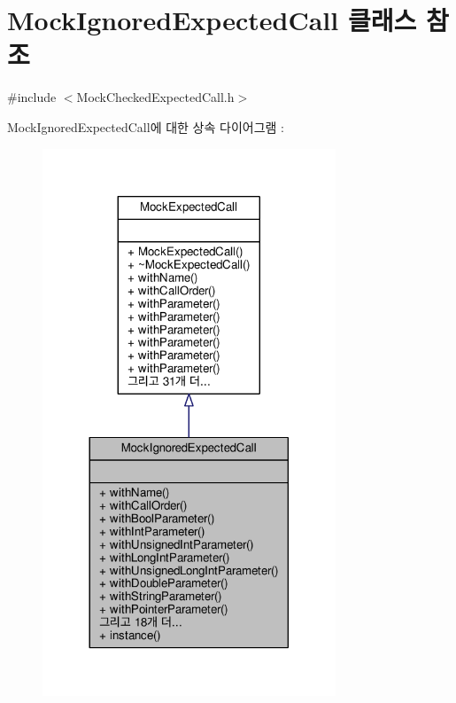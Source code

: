 \hypertarget{class_mock_ignored_expected_call}{}\section{Mock\+Ignored\+Expected\+Call 클래스 참조}
\label{class_mock_ignored_expected_call}


{\ttfamily \#include $<$Mock\+Checked\+Expected\+Call.\+h$>$}



Mock\+Ignored\+Expected\+Call에 대한 상속 다이어그램 \+: 
\nopagebreak
\begin{figure}[H]
\begin{center}
\leavevmode
\includegraphics[width=248pt]{class_mock_ignored_expected_call__inherit__graph}
\end{center}
\end{figure}


